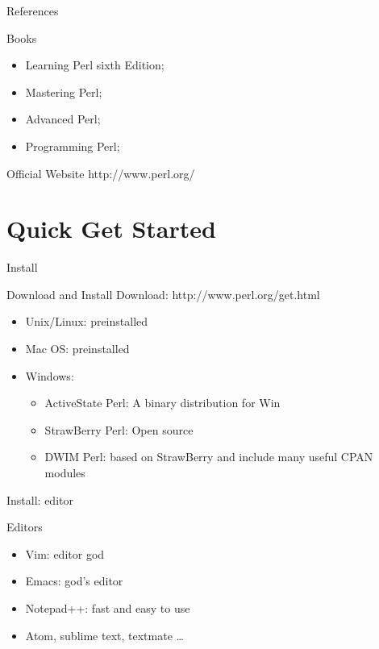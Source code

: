 \documentclass[UTF8]{beamer}
\begin{document}
\begin{frame}[t]{References}
\begin{block}{Books}
  \begin{itemize}
    \item Learning Perl sixth Edition;
    \item Mastering Perl;
    \item Advanced Perl;
    \item Programming Perl;
  \end{itemize}
\end{block}
\begin{block}{Official Website}
  http://www.perl.org/
\end{block}
\end{frame}

\section{Quick Get Started}

\begin{frame}[t]{Install}
\begin{block}{Download and Install}
  Download: http://www.perl.org/get.html
  \begin{itemize}
    \item Unix/Linux: preinstalled
    \item Mac OS: preinstalled
    \item Windows:
    \begin{itemize}
      \item ActiveState Perl: A binary distribution for Win
      \item StrawBerry Perl: Open source
      \item DWIM Perl: based on StrawBerry and include many useful CPAN modules
    \end{itemize}
  \end{itemize}
\end{block}
\end{frame}

\begin{frame}[t]{Install: editor}
\begin{block}{Editors}
  \begin{itemize}
    \item Vim: editor god
    \item Emacs: god's editor
    \item Notepad++: fast and easy to use
    \item Atom, sublime text, textmate \ldots
  \end{itemize}
\end{block}
\end{frame}
\end{document}
